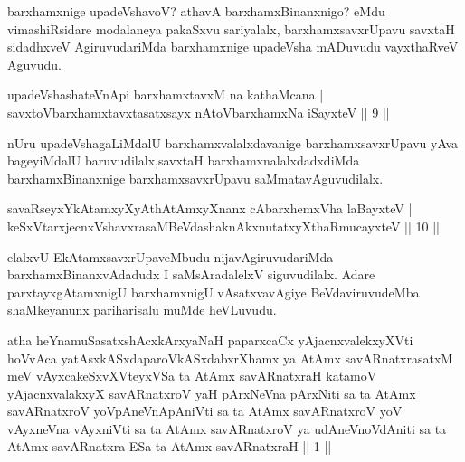 \begin{artha}
barxhamxnige upadeVshavoV? athavA barxhamxBinanxnigo? eMdu vimashiRsidare modalaneya pakaSxvu sariyalalx, barxhamxsavxrUpavu savxtaH sidadhxveV AgiruvudariMda barxhamxnige upadeVsha mADuvudu vayxthaRveV Aguvudu.
\end{artha}


\begin{shl}
upadeVshashateVnApi barxhamxtavxM na kathaMcana |\\
savxtoV\s barxhamxtavxtasatxsayx nAtoV\s barxhamxNa iSayxteV \hfill || 9 ||
\end{shl}

\begin{artha}
nUru upadeVshagaLiMdalU barxhamxvalalxdavanige barxhamxsavxrUpavu yAva bageyiMdalU baruvudilalx,savxtaH barxhamxnalalxdadxdiMda barxhamxBinanxnige barxhamxsavxrUpavu saMmatavAguvudilalx.
\end{artha}

\begin{shl}
savaRseyxYkAtamxyXyAthAtAmxyXnanx cAbarxhemxVha laBayxteV |\\
keSxVtarxjecnxVshavxrasaMBeVdashaknAkxnutatxyXthaRmucayxteV \hfill || 10 ||
\end{shl}

\begin{artha}
elalxvU EkAtamxsavxrUpaveMbudu nijavAgiruvudariMda barxhamxBinanxvAdadudx I saMsAradalelxV siguvudilalx. Adare parxtayxgAtamxnigU barxhamxnigU vAsatxvavAgiye BeVdaviruvudeMba shaMkeyanunx pariharisalu muMde heVLuvudu.
\end{artha}


\begin{kandikeshl}
atha heYnamuSasatxshAcxkArxyaNaH paparxcaCx yAjacnxvalekxyXVti hoVvAca yatAsxkASxdaparoVkASxdabxrXhamx ya AtAmx savARnatxrasatxM meV vAyxcakeSxvXVteyxVSa ta AtAmx savARnatxraH katamoV yAjacnxvalakxyX savARnatxroV yaH pArxNeVna pArxNiti sa ta AtAmx savARnatxroV yoV\s pAneVnApAniVti sa ta AtAmx savARnatxroV yoV vAyxneVna vAyxniVti sa ta AtAmx savARnatxroV ya udAneVnoVdAniti sa ta AtAmx savARnatxra ESa ta AtAmx savARnatxraH || 1 ||
\end{kandikeshl}

